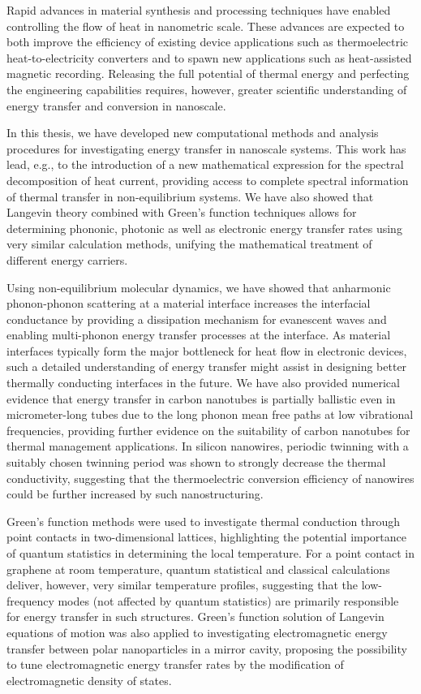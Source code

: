 
Rapid advances in material synthesis and processing techniques have enabled controlling the flow of heat in nanometric scale. These advances are expected to both improve the efficiency of existing device applications such as thermoelectric heat-to-electricity converters and to spawn new applications such as heat-assisted magnetic recording. Releasing the full potential of thermal energy and perfecting the engineering capabilities requires, however, greater scientific understanding of energy transfer and conversion in nanoscale.

In this thesis, we have developed new computational methods and analysis procedures for investigating energy transfer in nanoscale systems. This work has lead, e.g., to the introduction of a new mathematical expression for the spectral decomposition of heat current, providing access to complete spectral information of thermal transfer in non-equilibrium systems. We have also showed that Langevin theory combined with Green's function techniques allows for determining phononic, photonic as well as electronic energy transfer rates using very similar calculation methods, unifying the mathematical treatment of different energy carriers. %

Using non-equilibrium molecular dynamics, we have showed that anharmonic phonon-phonon scattering at a material interface increases the interfacial conductance by providing a dissipation mechanism for evanescent waves and enabling multi-phonon energy transfer processes at the interface. As material interfaces typically form the major bottleneck for heat flow in electronic devices, such a detailed understanding of energy transfer might assist in designing better thermally conducting interfaces in the future. We have also provided numerical evidence that energy transfer in carbon nanotubes is partially ballistic even in micrometer-long tubes due to the long phonon mean free paths at low vibrational frequencies, providing further evidence on the suitability of carbon nanotubes for thermal management applications. In silicon nanowires, periodic twinning with a suitably chosen twinning period was shown to strongly decrease the thermal conductivity, suggesting that the thermoelectric conversion efficiency of nanowires could be further increased by such nanostructuring. 

Green's function methods were used to investigate thermal conduction through point contacts in two-dimensional lattices, highlighting the potential importance of quantum statistics in determining the local temperature. For a point contact in graphene at room temperature, quantum statistical and classical calculations deliver, however, very similar temperature profiles, suggesting that the low-frequency modes (not affected by quantum statistics) are primarily responsible for energy transfer in such structures. Green's function solution of Langevin equations of motion was also applied to investigating electromagnetic energy transfer between polar nanoparticles in a mirror cavity, proposing the possibility to tune electromagnetic energy transfer rates by the modification of electromagnetic density of states. 

